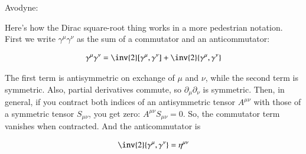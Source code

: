 Avodyne:

Here's how the Dirac square-root thing works in a more pedestrian notation.  First we write $\gamma^\mu\gamma^\nu$ as the sum of a commutator and an anticommutator:

\begin{align*}
\gamma^\mu \gamma^\nu = \inv{2}[\gamma^\mu,\gamma^\nu] + \inv{2} \{\gamma^\mu,\gamma^\nu\}
\end{align*}

The first term is antisymmetric on exchange of $\mu$ and $\nu$, while the second term is symmetric.  Also, partial derivatives commute, so $\partial_\mu\partial_\nu$ is symmetric.  Then, in general, if you contract both indices of an antisymmetric tensor $A^{\mu\nu}$ with those of a symmetric tensor $S_{\mu\nu}$, you get zero: $A^{\mu\nu}S_{\mu\nu}=0$.  
So, the commutator term vanishes when contracted.  And the anticommutator is 

\begin{align*}
\inv{2}\{\gamma^\mu,\gamma^\nu\}=\eta^{\mu\nu}
\end{align*}

%
%

%
